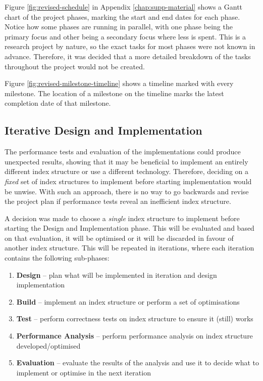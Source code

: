 Figure \ref{fig:revised-schedule} in Appendix \ref{chap:supp-material} shows a Gantt chart of the project phases, marking the start and end dates for each phase. Notice how some phases are running in parallel, with one phase being the primary focus and other being a secondary focus where less is spent. This is a research project by nature, so the exact tasks for most phases were not known in advance. Therefore, it was decided that a more detailed breakdown of the tasks throughout the project would not be created.

Figure \ref{fig:revised-milestone-timeline} shows a timeline marked with every milestone. The location of a milestone on the timeline marks the latest completion date of that milestone.

\subsection{Iterative Design and Implementation}
\label{sec:iterative-d-and-i}

The performance tests and evaluation of the implementations could produce unexpected results, showing that it may be beneficial to implement an entirely different index structure or use a different technology. Therefore, deciding on a \textit{fixed} set of index structures to implement before starting implementation would be unwise. With such an approach, there is no way to go backwards and revise the project plan if performance tests reveal an inefficient index structure.

A decision was made to choose a \textit{single} index structure to implement before starting the Design and Implementation phase. This will be evaluated and based on that evaluation, it will be optimised or it will be discarded in favour of another index structure. This will be repeated in iterations, where each iteration contains the following sub-phases:
\begin{enumerate}
	\item \textbf{Design} -- plan what will be implemented in iteration and design implementation
	\item \textbf{Build} -- implement an index structure or perform a set of optimisations
	\item \textbf{Test} -- perform correctness tests on index structure to ensure it (still) works
	\item \textbf{Performance Analysis} -- perform performance analysis on index structure developed/optimised
	\item \textbf{Evaluation} -- evaluate the results of the analysis and use it to decide what to implement or optimise in the next iteration
\end{enumerate}

